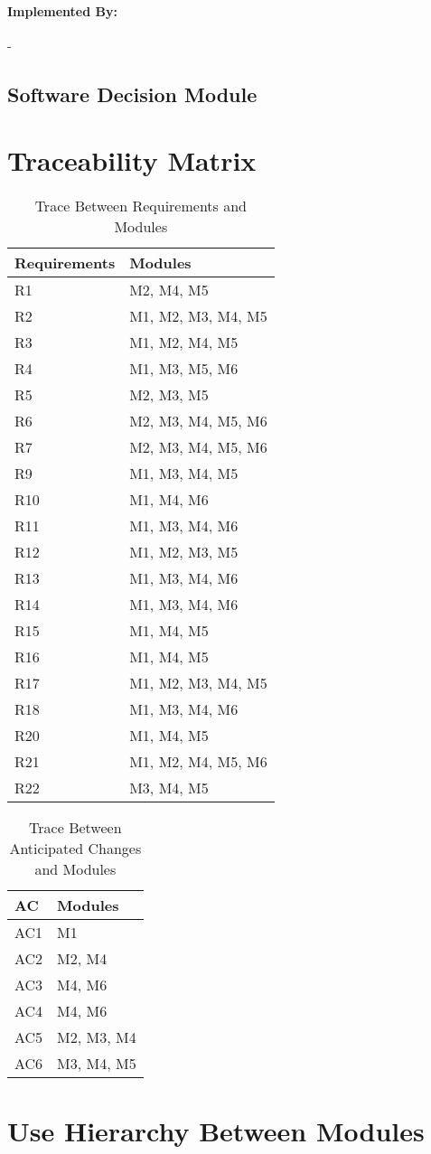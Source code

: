 \documentclass[12pt,letterpaper]{article}
\begin{document}
	\paragraph{Implemented By: } -

	\subsection{Software Decision Module}

	\section{Traceability Matrix}

\begin{table}[h!]
\centering
\begin{tabular}{p{} p{}}
\toprule
\textbf{Requirements} & \textbf{Modules}\\
\midrule
{R1} & M2, M4, M5 \\
{R2} & M1, M2, M3, M4, M5 \\
{R3} & M1, M2, M4, M5 \\
{R4} & M1, M3, M5, M6 \\
{R5} & M2, M3, M5 \\
{R6} & M2, M3, M4, M5, M6 \\
{R7} & M2, M3, M4, M5, M6 \\
{R9} & M1, M3, M4, M5 \\
{R10} & M1, M4, M6\\
{R11} & M1, M3, M4, M6\\
{R12} & M1, M2, M3, M5\\
{R13} & M1, M3, M4, M6\\
{R14} & M1, M3, M4, M6\\
{R15} & M1, M4, M5\\
{R16} & M1, M4, M5\\
{R17} & M1, M2, M3, M4, M5\\
{R18} & M1, M3, M4, M6\\
{R20} & M1, M4, M5\\
{R21} & M1, M2, M4, M5, M6\\
{R22} & M3, M4, M5\\
\bottomrule
\end{tabular}
\caption{Trace Between Requirements and Modules}
\label{TblRT}
\end{table}
\begin{table}[h!]
\centering
\begin{tabular}{p{} p{}}
\toprule
\textbf{AC} & \textbf{Modules}\\
\midrule
{AC1} & M1 \\
{AC2} & M2, M4 \\
{AC3} & M4, M6 \\
{AC4} & M4,  M6 \\
{AC5} & M2, M3, M4 \\
{AC6} & M3, M4, M5 \\
\bottomrule
\end{tabular}
\caption{Trace Between Anticipated Changes and Modules}
\label{TblACT}
\end{table}

	\section{Use Hierarchy Between Modules}
\end{document}
